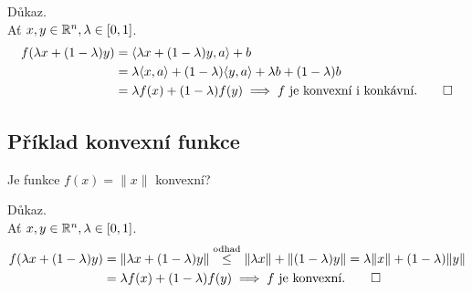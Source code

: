 Důkaz.\\
Ať  $x, y \in \mathbb{R}^n, \lambda \in [0,1]$.
\begin{align*}
    f(\lambda x + (1-\lambda) y) &= \langle \lambda x + (1-\lambda) y, a\rangle + b\\
    &= \lambda \langle x, a\rangle + (1-\lambda) \langle y, a\rangle + \lambda b + (1-\lambda)b\\
    &= \lambda f(x) + (1-\lambda) f(y) \implies f \text{ je konvexní i konkávní.} \qed
\end{align*}

\subsection{Příklad konvexní funkce}
Je funkce $f(x) = \| x\|$ konvexní?

Důkaz.\\
Ať $x, y \in \mathbb{R}^n, \lambda \in [0,1]$.
\begin{align*}
    f(\lambda x + (1-\lambda) y) &= \| \lambda x + (1-\lambda)y\| \stackrel{\text{odhad}}{\leq} \| \lambda x\| +
    \| (1-\lambda) y\| = \lambda \| x\| + (1-\lambda) \| y\| \\
    &= \lambda f(x) + (1-\lambda) f(y) \implies f \text{ je konvexní.} \qed
\end{align*}

